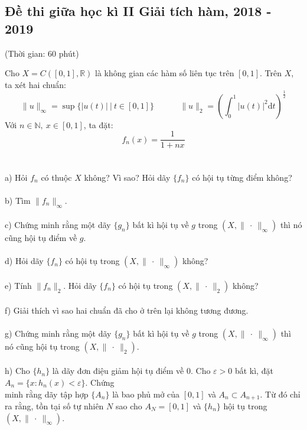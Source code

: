 \documentclass[10pt, a4paper]{article}
\begin{document}
\newpage

\subsection{Đề thi giữa học kì II Giải tích hàm, 2018 - 2019}
\begin{center}
	\color{blue}(Thời gian: 60 phút)
\end{center}
Cho $X=C([0,1],\mathbb R)$ là không gian các hàm số liên tục trên $[0,1]$. Trên $X$, ta xét hai chuẩn: $$\lVert u\rVert_\infty=\sup\{|u(t)|~|~t\in[0,1]\}~~~~~~~~~~~~~~\lVert u\rVert_2=\left(\displaystyle\int_0^1|u(t)|^2\text{d}t\right)^{\frac12}$$
Với $n\in\mathbb N,~x\in[0,1]$, ta đặt: $$f_n(x)=\dfrac{1}{1+nx}$$\\\\
\color{red}a) \color{black}Hỏi $f_n$ có thuộc $X$ không? Vì sao? Hỏi dãy $\{f_n\}$ có hội tụ từng điểm không?\\\\
\color{red}b) \color{black}Tìm $\lVert f_n\rVert_\infty$.\\\\
\color{red}c) \color{black}Chứng minh rằng một dãy $\{g_n\}$ bất kì hội tụ về $g$ trong $\left(X,\lVert~\cdot~\rVert_\infty\right)$ thì nó cũng hội tụ điểm về $g$.\\\\
\color{red}d) \color{black}Hỏi dãy $\{f_n\}$ có hội tụ trong $\left(X,\lVert~\cdot~\rVert_\infty\right)$ không?\\\\
\color{red}e) \color{black}Tính $\lVert f_n\rVert_2$. Hỏi dãy $\{f_n\}$ có hội tụ trong $\left(X,\lVert~\cdot~\rVert_2\right)$ không?\\\\
\color{red}f) \color{black}Giải thích vì sao hai chuẩn đã cho ở trên lại không tương đương.\\\\
\color{red}g) \color{black}Chứng minh rằng một dãy $\{g_n\}$ bất kì hội tụ về $g$ trong $\left(X,\lVert~\cdot~\rVert_\infty\right)$ thì nó cũng hội tụ trong $\left(X,\lVert~\cdot~\rVert_2\right)$.\\\\
\color{red}h) \color{black}Cho $\{h_n\}$ là dãy đơn điệu giảm hội tụ điểm về 0. Cho $\varepsilon>0$ bất kì, đặt $A_n=\{x:h_n(x)<\varepsilon\}$. Chứng\\ minh rằng dãy tập hợp $\{A_n\}$ là bao phủ mở của $[0,1]$ và $A_n\subset A_{n+1}$. Từ đó chỉ ra rằng, tồn tại số tự nhiên $N$ sao cho $A_N=[0,1]$ và $\{h_n\}$ hội tụ trong $\left(X,\lVert~\cdot~\rVert_\infty\right)$.
\end{document}
